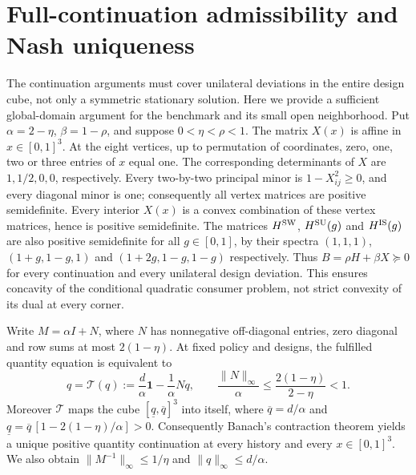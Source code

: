\section{Full-continuation admissibility and Nash uniqueness}\label{app:regularity}
The continuation arguments must cover unilateral deviations in the entire design cube, not only a symmetric stationary solution.  Here we provide a sufficient global-domain argument for the benchmark and its small open neighborhood. Put $\alpha=2-\eta$, $\beta=1-\rho$, and suppose $0<\eta<\rho<1$. The matrix $X(x)$ is affine in $x\in[0,1]^3$. At the eight vertices, up to permutation of coordinates, zero, one, two or three entries of $x$ equal one. The corresponding determinants of $X$ are $1,1/2,0,0$, respectively. Every two-by-two principal minor is $1-X_{ij}^2\ge0$, and every diagonal minor is one; consequently all vertex matrices are positive semidefinite. Every interior $X(x)$ is a convex combination of these vertex matrices, hence is positive semidefinite. The matrices $H^{\mathrm{SW}}$, $H^{\mathrm{SU}}(g)$ and $H^{\mathrm{IS}}(g)$ are also positive semidefinite for all $g\in[0,1]$, by their spectra $(1,1,1)$, $(1+g,1-g,1)$ and $(1+2g,1-g,1-g)$ respectively. Thus $B=\rho H+\beta X\succeq0$ for every continuation and every unilateral design deviation. This ensures concavity of the conditional quadratic consumer problem, not strict convexity of its dual at every corner.

Write $M=\alpha I+N$, where $N$ has nonnegative off-diagonal entries, zero diagonal and row sums at most $2(1-\eta)$. At fixed policy and designs, the fulfilled quantity equation is equivalent to
\begin{equation}\label{eq:boundfixed}
q=\mathcal T(q):=\frac d\alpha\mathbf1-\frac1\alpha Nq,\qquad
\frac{\|N\|_\infty}{\alpha}\leq\frac{2(1-\eta)}{2-\eta}<1.
\end{equation}
Moreover $\mathcal T$ maps the cube $[\underline q,\overline q]^3$ into itself, where $\overline q=d/\alpha$ and $\underline q=\overline q\,[1-2(1-\eta)/\alpha]>0$. Consequently Banach's contraction theorem yields a unique positive quantity continuation at every history and every $x\in[0,1]^3$. We also obtain $\|M^{-1}\|_\infty\leq1/\eta$ and $\|q\|_\infty\leq d/\alpha$.

